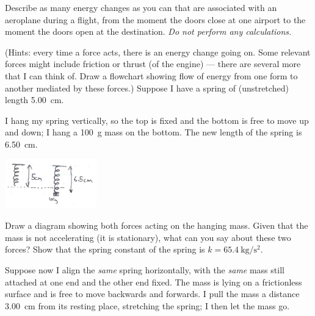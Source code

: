\documentclass[answers]{exam}
\begin{document}
\begin{questions}
  \question Describe as many energy changes as you can that are associated with an aeroplane during a flight,
            from the moment the doors close at one airport to the moment the doors open at the destination.
            \emph{Do not perform any calculations.}

            (Hints: every time a force acts, there is an energy change going on. Some relevant forces might
            include friction or thrust (of the engine) --- there are several more that I can think of. Draw
            a flowchart showing flow of energy from one form to another mediated by these forces.)
  \question Suppose I have a spring of (unstretched) length \SI{5.00}{\centi\metre}.
    \begin{parts}
      \item I hang my spring vertically, so the top is fixed and the bottom is free to
            move up and down; I hang a \SI{100}{\gram} mass on the bottom. The new
            length of the spring is \SI{6.50}{\centi\metre}.

            \includegraphics[width=0.3\textwidth]{2spring1}
        \begin{subparts}
          \subpart Draw a diagram showing both forces acting on the hanging mass. Given that
                   the mass is not accelerating (it is stationary), what can you say about these
                   two forces?
          \subpart Show that the spring constant of the spring is $ k = \SI{65.4}{\kilo\gram\per\second\squared} $.
        \end{subparts}
      \item Suppose now I align the \emph{same} spring horizontally, with the \emph{same} mass still attached at one end and the other end fixed.
            The mass is lying on a frictionless surface and is free to move backwards and forwards. I pull the mass a distance \SI{3.00}{\centi\metre}
            from its resting place, stretching the spring; I then let the mass go.


\end{parts}
\end{questions}
\end{document}
